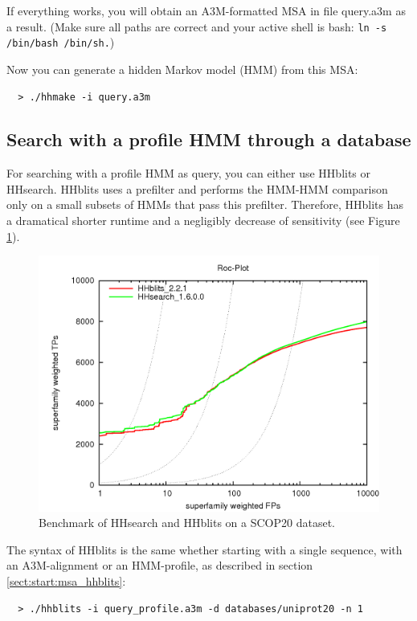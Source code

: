\documentclass[11pt,a4paper]{article}
\begin{document}
If everything works, you will obtain an A3M-formatted MSA in file query.a3m 
as a result. (Make sure all paths are correct and your active shell is bash: 
\verb`ln -s /bin/bash /bin/sh.`)

Now you can generate a hidden Markov model (HMM) from this MSA:
\begin{verbatim}
  > ./hhmake -i query.a3m
\end{verbatim}


\subsection{Search with a profile HMM through a database}

For searching with a profile HMM as query, you can either use HHblits or HHsearch. HHblits
uses a prefilter and performs the HMM-HMM comparison only on a small subsets of HMMs that pass
this prefilter. Therefore, HHblits has a dramatical shorter runtime and a negligibly decrease of
sensitivity (see Figure \ref{fig:hhsearch_hhblits_bench}). 

\begin{figure}[t]
\includegraphics[width=\textwidth]{hhblits-hhsearch.png}
\caption{Benchmark of HHsearch and HHblits on a SCOP20 dataset.}
\label{fig:hhsearch_hhblits_bench}
\end{figure}

The syntax of HHblits is the same whether starting with a single sequence, with an A3M-alignment
or an HMM-profile, as described in section \ref{sect:start:msa_hhblits}:

\begin{verbatim}
  > ./hhblits -i query_profile.a3m -d databases/uniprot20 -n 1
\end{verbatim}
\end{document}
